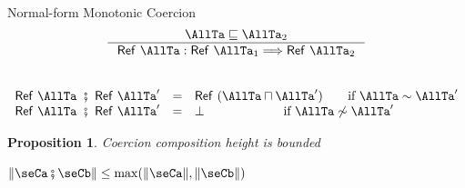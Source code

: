 \documentclass[12pt,dvipsnames]{beamer}
\newcommand{\RefT}[1]{\ensuremath{\mathsf{Ref}\ #1}}
\newcommand{\TypePreciseness}{\sqsubseteq}
\newcommand{\RefCoercion}[1]{\ensuremath{\mathsf{Ref}\ #1}}
\newcommand{\FailCoercionSE}{\ensuremath{\bot}}
\newcommand{\glbt}{\sqcap}
\newcommand{\ComposeCoercion}{\fatsemi}
\newcounter{stuff}
\newtheorem{prop}[stuff]{Proposition}
\begin{document}
\begin{frame}{Normal-form Monotonic Coercion}
\begin{gather*}
  \inference{\AllTa \TypePreciseness \AllTa_2}{\RefCoercion{\AllTa} : \RefT{\AllTa_1} \Longrightarrow
    \RefT{\AllTa_2}}
\end{gather*}
\\
\[
    \begin{array}{rcl}
      \RefCoercion{\AllTa}\ \ComposeCoercion\ \RefCoercion{\AllTa'}
                                        & = &
                                              \RefCoercion{(\AllTa \glbt
                                              \AllTa')} \qquad \text{if } \AllTa \sim
                                              \AllTa'  \\
      \RefCoercion{\AllTa}\ \ComposeCoercion\ \RefCoercion{\AllTa'}
                                        & = &
                                              \FailCoercionSE
                                              \qquad\qquad\qquad \text{ if } \AllTa \not\sim
                                              \AllTa'
    \end{array}
  \]

\begin{prop}{Coercion composition height is bounded}
  \begin{center}
    $\| \seCa \ComposeCoercion \seCb\| \leq \max (\| \seCa \|, \| \seCb
    \|)$
  \end{center}
\end{prop}
\end{frame}
\end{document}
